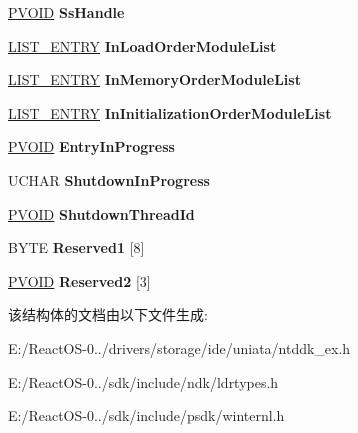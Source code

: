 \begin{DoxyCompactItemize}
\hyperlink{interfacevoid}{P\+V\+O\+ID} {\bfseries Ss\+Handle}
\item 
\mbox{\label{struct___p_e_b___l_d_r___d_a_t_a_ab301a08e20a78a7f334bfd351a0cca25}} 
\hyperlink{struct___l_i_s_t___e_n_t_r_y}{L\+I\+S\+T\+\_\+\+E\+N\+T\+RY} {\bfseries In\+Load\+Order\+Module\+List}
\item 
\mbox{\label{struct___p_e_b___l_d_r___d_a_t_a_a84cc2fa96f7fe4038637cfe104f9e567}} 
\hyperlink{struct___l_i_s_t___e_n_t_r_y}{L\+I\+S\+T\+\_\+\+E\+N\+T\+RY} {\bfseries In\+Memory\+Order\+Module\+List}
\item 
\mbox{\label{struct___p_e_b___l_d_r___d_a_t_a_a564d059941af20f04fe8a598fe20792b}} 
\hyperlink{struct___l_i_s_t___e_n_t_r_y}{L\+I\+S\+T\+\_\+\+E\+N\+T\+RY} {\bfseries In\+Initialization\+Order\+Module\+List}
\item 
\mbox{\label{struct___p_e_b___l_d_r___d_a_t_a_a27469c5db59cd2b442de97d11cdbf9f0}} 
\hyperlink{interfacevoid}{P\+V\+O\+ID} {\bfseries Entry\+In\+Progress}
\item 
\mbox{\label{struct___p_e_b___l_d_r___d_a_t_a_a3d15c72cd151cb15b1542edb4768f5db}} 
U\+C\+H\+AR {\bfseries Shutdown\+In\+Progress}
\item 
\mbox{\label{struct___p_e_b___l_d_r___d_a_t_a_a404e7c05c2e18f62ea54a674e82a3ac2}} 
\hyperlink{interfacevoid}{P\+V\+O\+ID} {\bfseries Shutdown\+Thread\+Id}
\item 
\mbox{\label{struct___p_e_b___l_d_r___d_a_t_a_a3a59722c5b526cd5958e7d8ba4273b48}} 
B\+Y\+TE {\bfseries Reserved1} \mbox{[}8\mbox{]}
\item 
\mbox{\label{struct___p_e_b___l_d_r___d_a_t_a_ae03dc4a02889a4a4f6a35bfe261892f9}} 
\hyperlink{interfacevoid}{P\+V\+O\+ID} {\bfseries Reserved2} \mbox{[}3\mbox{]}
\end{DoxyCompactItemize}


该结构体的文档由以下文件生成\+:\begin{DoxyCompactItemize}
\item 
E\+:/\+React\+O\+S-\/0../drivers/storage/ide/uniata/ntddk\+\_\+ex.\+h\item 
E\+:/\+React\+O\+S-\/0../sdk/include/ndk/ldrtypes.\+h\item 
E\+:/\+React\+O\+S-\/0../sdk/include/psdk/winternl.\+h\end{DoxyCompactItemize}
